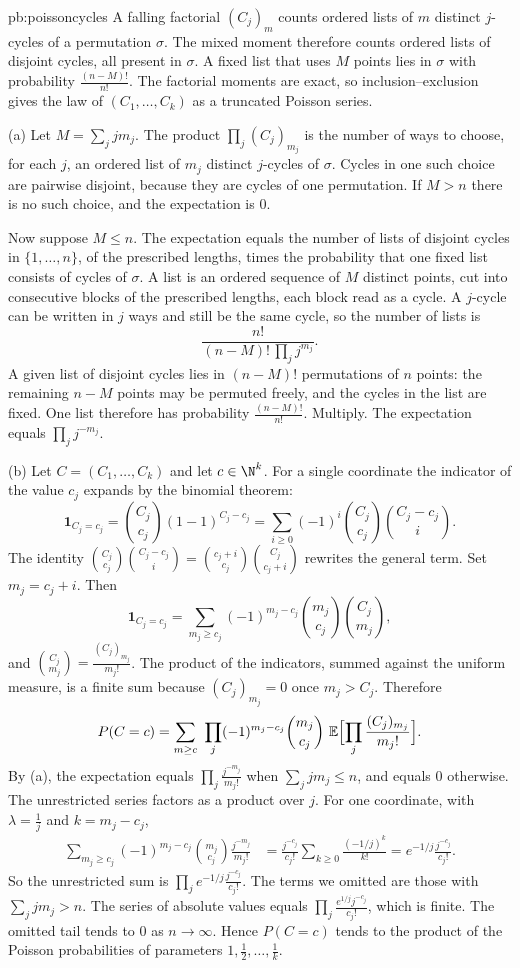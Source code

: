 \begin{solution}{pb:poissoncycles}
\idea A falling factorial $(C_j)_m$ counts ordered lists of $m$ distinct $j$-cycles of a permutation $\sigma$. The mixed moment therefore counts ordered lists of disjoint cycles, all present in $\sigma$. A fixed list that uses $M$ points lies in $\sigma$ with probability $\frac{(n-M)!}{n!}$. The factorial moments are exact, so inclusion--exclusion gives the law of $(C_1,\dots,C_k)$ as a truncated Poisson series.

\writeup (a) Let $M=\sum_j jm_j$. The product $\prod_j(C_j)_{m_j}$ is the number of ways to choose, for each $j$, an ordered list of $m_j$ distinct $j$-cycles of $\sigma$. Cycles in one such choice are pairwise disjoint, because they are cycles of one permutation. If $M>n$ there is no such choice, and the expectation is $0$.

Now suppose $M\le n$. The expectation equals the number of lists of disjoint cycles in $\{1,\dots,n\}$, of the prescribed lengths, times the probability that one fixed list consists of cycles of $\sigma$. A list is an ordered sequence of $M$ distinct points, cut into consecutive blocks of the prescribed lengths, each block read as a cycle. A $j$-cycle can be written in $j$ ways and still be the same cycle, so the number of lists is
\[
\frac{n!}{(n-M)!\,\prod_j j^{m_j}}.
\]
A given list of disjoint cycles lies in $(n-M)!$ permutations of $n$ points: the remaining $n-M$ points may be permuted freely, and the cycles in the list are fixed. One list therefore has probability $\frac{(n-M)!}{n!}$. Multiply. The expectation equals $\prod_j j^{-m_j}$.

(b) Let $C=(C_1,\dots,C_k)$ and let $c\in\N^k$. For a single coordinate the indicator of the value $c_j$ expands by the binomial theorem:
\[
\mathbf 1_{C_j=c_j}=\binom{C_j}{c_j}(1-1)^{C_j-c_j}=\sum_{i\ge 0}(-1)^i\binom{C_j}{c_j}\binom{C_j-c_j}{i}.
\]
The identity $\binom{C_j}{c_j}\binom{C_j-c_j}{i}=\binom{c_j+i}{c_j}\binom{C_j}{c_j+i}$ rewrites the general term. Set $m_j=c_j+i$. Then
\[
\mathbf 1_{C_j=c_j}=\sum_{m_j\ge c_j}(-1)^{m_j-c_j}\binom{m_j}{c_j}\binom{C_j}{m_j},
\]
and $\binom{C_j}{m_j}=\frac{(C_j)_{m_j}}{m_j!}$. The product of the indicators, summed against the uniform measure, is a finite sum because $(C_j)_{m_j}=0$ once $m_j>C_j$. Therefore
\[
P(C=c)=\sum_{m\ge c}\ \prod_j(-1)^{m_j-c_j}\binom{m_j}{c_j}\ \mathbb E\Bigl[\prod_j\frac{(C_j)_{m_j}}{m_j!}\Bigr].
\]
By (a), the expectation equals $\prod_j\frac{j^{-m_j}}{m_j!}$ when $\sum_j jm_j\le n$, and equals $0$ otherwise. The unrestricted series factors as a product over $j$. For one coordinate, with $\lambda=\frac1j$ and $k=m_j-c_j$,
\begin{align*}
\sum_{m_j\ge c_j}(-1)^{m_j-c_j}\binom{m_j}{c_j}\frac{j^{-m_j}}{m_j!}
&=\frac{j^{-c_j}}{c_j!}\sum_{k\ge 0}\frac{(-1/j)^k}{k!}
=e^{-1/j}\frac{j^{-c_j}}{c_j!}.
\end{align*}
So the unrestricted sum is $\prod_j e^{-1/j}\frac{j^{-c_j}}{c_j!}$. The terms we omitted are those with $\sum_j jm_j>n$. The series of absolute values equals $\prod_j\frac{e^{1/j}j^{-c_j}}{c_j!}$, which is finite. The omitted tail tends to $0$ as $n\to\infty$. Hence $P(C=c)$ tends to the product of the Poisson probabilities of parameters $1,\frac12,\dots,\frac1k$.


\end{solution}
